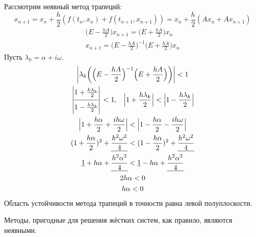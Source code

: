 \documentclass[a4paper,11pt]{article}
\begin{document}
\noindent Рассмотрим неявный метод трапеций:
\[x_{n+1} = x_n + \frac{h}{2}(f(t_n, x_n) + f(t_{n+1}, x_{n+1})) = x_n + \frac{h}{2}(Ax_n + Ax_{n+1})\]
\begin{gather*}
  \Big(E - \frac{hA}{2}\Big)x_{n+1} = \Big(E + \frac{hA}{2}\Big)x_n \\
  x_{n+1} = \Big(E - \frac{hA}{2}\Big)^{-1}\Big(E + \frac{hA}{2}\Big)x_n
\end{gather*}
Пусть $\lambda_k = \alpha + i\omega$.
\begin{gather*}
  \bigg|\lambda_k\bigg(\Big(E - \frac{hA}{2}\Big)^{-1}\Big(E + \frac{hA}{2}\Big)\bigg)\bigg| < 1 \\
  \frac{\Big|1 + \frac{h\lambda_k}{2}\Big|}{\Big|1 - \frac{h\lambda_k}{2}\Big|} < 1, \hspace{3mm}
  \Big|1 + \frac{h\lambda_k}{2}\Big| < \Big|1 - \frac{h\lambda_k}{2}\Big| \\
  \Big|1 + \frac{h\alpha}{2} + \frac{ih\omega}{2}\Big| < \Big|1 - \frac{h\alpha}{2} - \frac{ih\omega}{2}\Big| \\
  (1 + \frac{h\alpha}{2})^2 + \underline{\frac{h^2\omega^2}{4}} < (1 - \frac{h\alpha}{2})^2 + \underline{\frac{h^2\omega^2}{4}} \\
  \underline{1} + h\alpha + \underline{\frac{h^2\alpha^2}{4}} < \underline{1} - h\alpha + \underline{\frac{h^2\alpha^2}{4}} \\
  2h\alpha < 0 \\
  h\alpha < 0
\end{gather*}
Область устойчивости метода трапеций в точности равна левой полуплоскости.\\

\begin{importantblock}
  Методы, пригодные для решения жёстких систем, как правило, являются неявными.
\end{importantblock}
\end{document}
